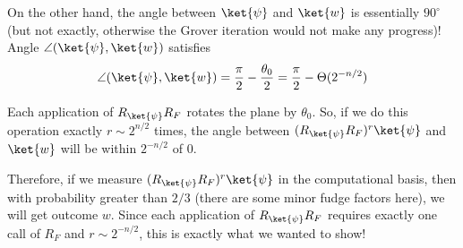 \documentclass{article}
\begin{document}
On the other hand, the angle between $\ket{\psi}$ and $\ket{w}$ is essentially $90^{\circ}$ (but not exactly, otherwise the Grover iteration would not make any progress)! Angle $\angle(\ket{\psi},\ket{w})$ satisfies \[\angle(\ket{\psi},\ket{w}) = \frac{\pi}{2}-\frac{\theta_0}{2}=\frac{\pi}{2} - \Theta(2^{-n/2})\]

Each application of $R_{\ket{\psi}}R_F$ rotates the plane by $\theta_0$. So, if we do this operation exactly $r \sim 2^{n/2}$ times, the angle between $(R_{\ket{\psi}}R_F)^r\ket{\psi}$ and $\ket{w}$ will be within $2^{-n/2}$ of $0$.

Therefore, if we measure $(R_{\ket{\psi}} R_F)^r \ket{\psi}$ in the computational basis, then with probability greater than $2/3$ (there are some minor fudge factors here), we will get outcome $w$.  Since each application of $R_{\ket{\psi}} R_F$ requires exactly one call of $R_F$ and $r \sim 2^{-n/2}$, this is exactly what we wanted to show!
\end{document}
